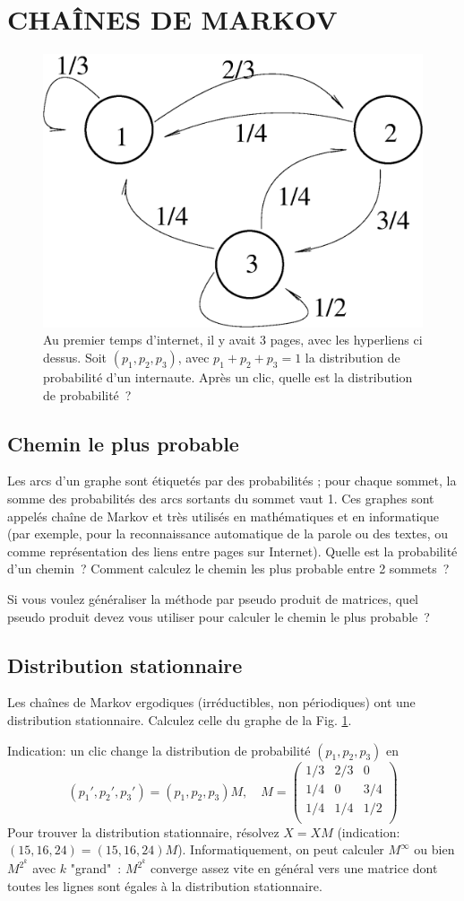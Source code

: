 \documentclass[a4paper]{article}
\begin{document}
\section{CHA\^INES DE MARKOV}
{
\begin{figure}[h]
\begin{center}
\includegraphics[width=0.4\linewidth]{markov.eps}
\end{center}
\caption{\label{markov} Au premier temps d'internet, il y avait 3 pages, avec les hyperliens ci dessus.
Soit $(p_1, p_2, p_3)$, avec $p_1+p_2+p_3=1$ la distribution de probabilit\'e d'un internaute.
Apr\`es un clic, quelle est la distribution de probabilit\'e~?}
\end{figure}
}
\subsection{Chemin le plus probable}
Les arcs d'un graphe sont \'etiquet\'es par des probabilit\'es ; pour chaque sommet,
la somme des probabilit\'es des
arcs sortants du sommet vaut 1. Ces graphes sont appel\'es cha\^ine de Markov et tr\`es utilis\'es
en math\'ematiques et en informatique (par exemple, pour la reconnaissance automatique de la parole ou des textes, ou comme repr\'esentation des liens entre pages sur Internet). 
Quelle est la probabilit\'e d'un chemin~? 
Comment calculez le chemin les plus probable entre 2 sommets~?

Si vous voulez g\'en\'eraliser la m\'ethode par pseudo produit de matrices, quel
pseudo produit devez vous utiliser pour calculer le chemin le plus probable~?


\subsection{Distribution stationnaire}
Les cha\^ines de Markov ergodiques (irr\'eductibles, non p\'eriodiques) ont une distribution
stationnaire. Calculez celle du graphe de la Fig. \ref{markov}.

Indication:  un clic change la distribution de probabilit\'e $(p_1, p_2, p_3)$ en
$$(p_1', p_2', p_3') = (p_1, p_2, p_3) M, \quad M=\left( \begin{array}{ccc} 1/3 & 2/3 & 0 \\
1/4 & 0 & 3/4 \\
1/4 & 1/4 & 1/2 \\
\end{array}\right)$$
Pour trouver la distribution stationnaire, r\'esolvez $X=XM$ (indication: $(15, 16, 24)=(15, 16, 24)M$).
Informatiquement, on peut calculer $M^{\infty}$ ou bien $M^{2^k}$ avec $k$ "grand"~: $M^{2^k}$
converge assez vite en g\'en\'eral vers une matrice dont toutes les lignes sont \'egales \`a la distribution stationnaire.
\end{document}
